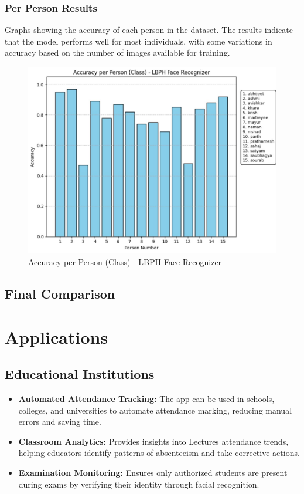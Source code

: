 \documentclass[openany]{report}
\begin{document}
\subsection{Per Person Results}
Graphs showing the accuracy of each person in the dataset. The results indicate that the model performs well for most individuals, with some variations in accuracy based on the number of images available for training.
\begin{figure}[H]
    \centering
    \includegraphics[width=.95\textwidth]{../imgs/accuracy per person.jpg}
    \caption{Accuracy per Person (Class) - LBPH Face Recognizer}
\end{figure}

\section{Final Comparison} 
\chapter{Applications}

\section{Educational Institutions}
\begin{itemize}
    \item \textbf{Automated Attendance Tracking:} The app can be used in schools, colleges, and universities to automate attendance marking, reducing manual errors and saving time.
    \item \textbf{Classroom Analytics:} Provides insights into Lectures attendance trends, helping educators identify patterns of absenteeism and take corrective actions.
    \item \textbf{Examination Monitoring:} Ensures only authorized students are present during exams by verifying their identity through facial recognition.
\end{itemize}
\end{document}

